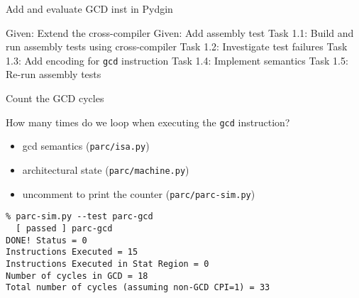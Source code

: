 
\begin{frame}{ Add and evaluate GCD inst in Pydgin}
\begin{cbxlist}
  \1 Given: Extend the cross-compiler
  \1 Given: Add assembly test
  \1 Task 1.1: Build and run assembly tests using cross-compiler
  \1 Task 1.2: Investigate test failures
  \1 Task 1.3: Add encoding for \texttt{gcd} instruction
  \1 Task 1.4: Implement semantics
  \1 Task 1.5: Re-run assembly tests
  \1 
  \1 
  \1 
\end{cbxlist}
\end{frame}


\begin{task}
\begin{frame}[fragile]{Count the GCD cycles}

{}How many times do we loop when executing the \texttt{gcd} instruction?

\begin{itemize}
  \item gcd semantics (\texttt{parc/isa.py})
  \item architectural state (\texttt{parc/machine.py})
  \item uncomment to print the counter (\texttt{parc/parc-sim.py})
\end{itemize}

\begin{Verbatim}[commandchars=\\\{\}]
% cd \midtilde/pydgin/parc/asm_tests/build
% parc-sim.py --test parc-gcd
  [ passed ] parc-gcd
DONE! Status = 0
Instructions Executed = 15
Instructions Executed in Stat Region = 0
Number of cycles in GCD = 18
Total number of cycles (assuming non-GCD CPI=1) = 33
\end{Verbatim}

\end{frame}
\end{task}



